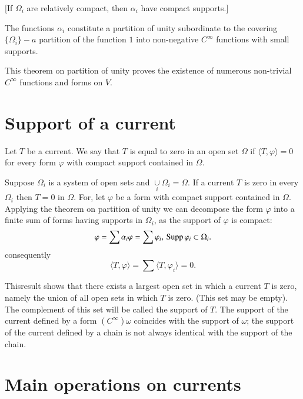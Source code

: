[If $\Omega_{i}$ are relatively compact, then $\alpha_{i}$ have
  compact supports.]

The functions $\alpha_{i}$ constitute a partition of unity subordinate
to the covering $\{\Omega_{i}\}-a$ partition of the function $1$ into
non-negative $C^{\infty}$ functions with small supports.

This theorem on partition of unity proves the existence of numerous
non-trivial $C^{\infty}$ functions and forms on $V$. 

\section*{Support of a current}

Let $T$ be a current. We say that $T$ is equal to zero in an open set
$\Omega$ if $\langle T,\varphi\rangle=0$ for every form $\varphi$ with
compact support contained in $\Omega$.

Suppose $\Omega_{i}$ is a system of open sets and
$\underset{i}{\cup}\Omega_{i}=\Omega$. If a current $T$ is zero in
every $\Omega_{i}$ then $T=0$ in $\Omega$. For, let $\varphi$ be a
form with compact support contained in $\Omega$. Applying the theorem
on partition of unity we can decompose the form $\varphi$ into a
finite sum of forms having supports in $\Omega_{i}$, as the support of
$\varphi$ is compact:
$$
\varphi=\sum \alpha_{i}\varphi=\sum\varphi_{i}, \,\operatorname{Supp}
\varphi_{i}\subset \Omega_{i}.
$$
consequently
$$
\langle T,\varphi\rangle =\sum\langle T,\varphi_{i}\rangle =0.
$$

This\pageoriginale result shows that there exists a largest open set
in which a current $T$ is zero, namely the union of all open sets in
which $T$ is zero. (This set may be empty). The complement of this set
will be called the support of $T$. The support of the current defined
by a form $(C^{\infty})\omega$ coincides with the support of $\omega$;
the support of the current defined by a chain is not always identical
with the support of the chain.

\section*{Main operations on currents}

